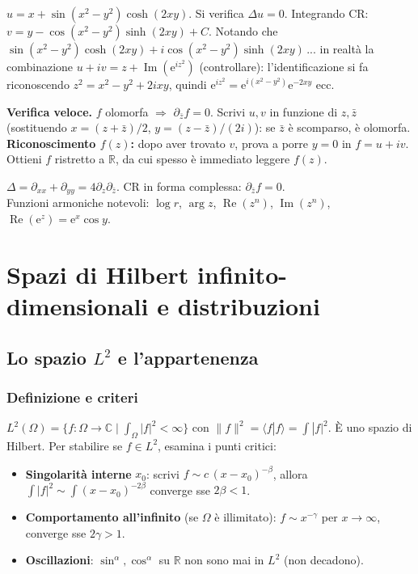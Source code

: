 \documentclass[11pt,a4paper,openany]{book}
\theoremstyle{definition}
\newcommand{\R}{\mathbb{R}}
\newcommand{\C}{\mathbb{C}}
\newcommand{\braket}[2]{\langle#1|#2\rangle}
\newcommand{\eu}{\mathrm{e}}
\renewcommand{\Re}{\operatorname{Re}}
\renewcommand{\Im}{\operatorname{Im}}
\begin{document}
\begin{esempio}[Scritto 12/02/2025, Es. 1]
$u=x+\sin(x^2-y^2)\cosh(2xy)$. Si verifica $\Delta u=0$. Integrando CR: $v=y-\cos(x^2-y^2)\sinh(2xy)+C$. Notando che $\sin(x^2-y^2)\cosh(2xy)+i\cos(x^2-y^2)\sinh(2xy)\,$... in realt\`a la combinazione $u+iv=z+\Im(\eu^{iz^2})$ (controllare): l'identificazione si fa riconoscendo $z^2=x^2-y^2+2ixy$, quindi $\eu^{iz^2}=\eu^{i(x^2-y^2)}\eu^{-2xy}$ ecc.
\end{esempio}

\begin{trucco}
\textbf{Verifica veloce.} $f$ olomorfa $\Rightarrow$ $\partial_{\bar z}f=0$. Scrivi $u,v$ in funzione di $z,\bar z$ (sostituendo $x=(z+\bar z)/2$, $y=(z-\bar z)/(2i)$): se $\bar z$ \`e scomparso, \`e olomorfa.\\
\textbf{Riconoscimento $f(z)$:} dopo aver trovato $v$, prova a porre $y=0$ in $f=u+iv$. Ottieni $f$ ristretto a $\R$, da cui spesso \`e immediato leggere $f(z)$.
\end{trucco}

\begin{formulario}
$\Delta=\partial_{xx}+\partial_{yy}=4\partial_z\partial_{\bar z}$. CR in forma complessa: $\partial_{\bar z}f=0$.\\
Funzioni armoniche notevoli: $\log r$, $\arg z$, $\Re(z^n)$, $\Im(z^n)$, $\Re(\eu^z)=\eu^x\cos y$.
\end{formulario}

\part{Spazi di Hilbert infinito-dimensionali e distribuzioni}

\chapter{Lo spazio $L^2$ e l'appartenenza}

\section{Definizione e criteri}

\begin{teoria}
$L^2(\Omega)=\{f:\Omega\to\C\mid \int_\Omega|f|^2<\infty\}$ con $\|f\|^2=\braket{f}{f}=\int|f|^2$. \`E uno spazio di Hilbert. Per stabilire se $f\in L^2$, esamina i punti critici:
\begin{itemize}
\item \textbf{Singolarit\`a interne} $x_0$: scrivi $f\sim c\,(x-x_0)^{-\beta}$, allora $\int|f|^2\sim\int(x-x_0)^{-2\beta}$ converge sse $2\beta<1$.
\item \textbf{Comportamento all'infinito} (se $\Omega$ \`e illimitato): $f\sim x^{-\gamma}$ per $x\to\infty$, converge sse $2\gamma>1$.
\item \textbf{Oscillazioni}: $\sin^\alpha,\cos^\alpha$ su $\R$ non sono mai in $L^2$ (non decadono).
\end{itemize}
\end{teoria}
\end{document}

